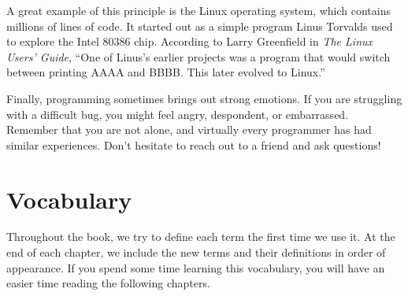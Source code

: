 
A great example of this principle is the Linux operating system, which contains millions of lines of code.
It started out as a simple program Linus Torvalds used to explore the Intel 80386 chip.
According to Larry Greenfield in {\it The Linux Users' Guide}, ``One of Linus's earlier projects was a program that would switch between printing AAAA and BBBB.
This later evolved to Linux.''


Finally, programming sometimes brings out strong emotions.
If you are struggling with a difficult bug, you might feel angry, despondent, or embarrassed.
Remember that you are not alone, and virtually every programmer has had similar experiences.
Don't hesitate to reach out to a friend and ask questions!


\section{Vocabulary}

Throughout the book, we try to define each term the first time we use it.
At the end of each chapter, we include the new terms and their definitions in order of appearance.
If you spend some time learning this vocabulary, you will have an easier time reading the following chapters.

